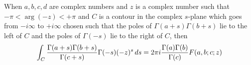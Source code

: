 \documentclass[12pt]{article}
\begin{document}
When $a,b,c,d$ are complex numbers and $z$ is a complex number 
such that $-\pi < \arg (-z) < +\pi$ and $C$ is a contour in the 
complex $s$-plane which goes from $-i \infty$ to $+ i \infty$ 
chosen such that the poles of $\Gamma (a+s) \Gamma (b+s)$ lie
to the left of $C$ and the poles of $\Gamma (-s)$ lie to the
right of $C$, then
\[
\int_C {\Gamma (a+s) \Gamma (b+s) \over \Gamma (c+s)}
\Gamma (-s) (-z)^s \, ds = 
2 \pi i {\Gamma (a) \Gamma (b) \over \Gamma (c)} F (a, b; c; z)
\]
\end{document}
